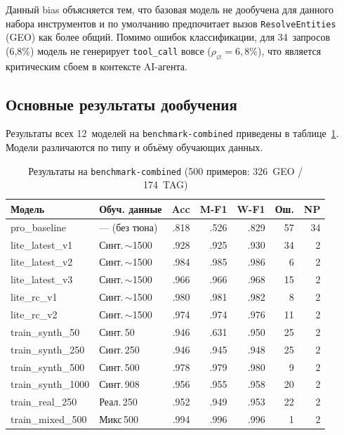 Данный bias объясняется тем, что базовая модель не дообучена для данного набора инструментов и по умолчанию предпочитает вызов \texttt{ResolveEntities} (GEO) как более общий. Помимо ошибок классификации, для 34~запросов (6{,}8\%) модель не генерирует \texttt{tool\_call} вовсе ($\rho_\varnothing = 6{,}8\%$), что является критическим сбоем в контексте AI-агента.

\subsection{Основные результаты дообучения} \label{subsec:main_results}

Результаты всех 12~моделей на \texttt{benchmark-combined} приведены в таблице~\ref{tab:combined_results}. Модели различаются по типу и объёму обучающих данных.

\begin{table}[H]
\centering
\caption{Результаты на \texttt{benchmark-combined} (500 примеров: 326~GEO / 174~TAG)}
\label{tab:combined_results}
\def\arraystretch{1.15}
\setlength\tabcolsep{0.3em}
{\small
\begin{tabular}{l l r r r r r}
    \toprule
    \textbf{Модель} & \textbf{Обуч. данные} & \textbf{Acc} & \textbf{M-F1} & \textbf{W-F1} & \textbf{Ош.} & \textbf{NP} \\
    \midrule
    pro\_baseline       & --- (без тюна)    & .818 & .526 & .829 & 57 & 34 \\
    \midrule
    lite\_latest\_v1    & Синт.\,${\sim}$1500 & .928 & .925 & .930 & 34 &  2 \\
    lite\_latest\_v2    & Синт.\,${\sim}$1500 & .984 & .985 & .986 &  6 &  2 \\
    lite\_latest\_v3    & Синт.\,${\sim}$1500 & .966 & .966 & .968 & 15 &  2 \\
    \midrule
    lite\_rc\_v1        & Синт.\,${\sim}$1500 & .980 & .981 & .982 &  8 &  2 \\
    lite\_rc\_v2        & Синт.\,${\sim}$1500 & .974 & .974 & .976 & 11 &  2 \\
    \midrule
    train\_synth\_50    & Синт.\,50        & .946 & .631 & .950 & 25 &  2 \\
    train\_synth\_250   & Синт.\,250       & .946 & .945 & .948 & 25 &  2 \\
    train\_synth\_500   & Синт.\,500       & .978 & .979 & .980 &  9 &  2 \\
    train\_synth\_1000  & Синт.\,908       & .956 & .955 & .958 & 20 &  2 \\
    \midrule
    train\_real\_250    & Реал.\,250         & .952 & .949 & .953 & 22 &  2 \\
    train\_mixed\_500   & Микс\,500          & .994 & .996 & .996 &  1 &  2 \\
    \bottomrule
\end{tabular}
}
\end{table}

